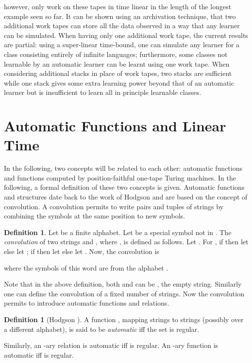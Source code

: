 \documentclass{LMCS}
\theoremstyle{plain}\newtheorem{athm}[thm]{Theorem}
\theoremstyle{plain}\newtheorem{aprop}[thm]{Proposition}
\theoremstyle{plain}\newtheorem{aprob}[thm]{Open Problem}
\theoremstyle{plain}\newtheorem{acor}[thm]{Corollary}
\theoremstyle{plain}\newtheorem{alem}[thm]{Lemma}
\theoremstyle{definition}\newtheorem{adefn}[thm]{Definition}
\theoremstyle{definition}\newtheorem{arem}[thm]{Remark}
\theoremstyle{plain}\newtheorem{aexmp}[thm]{Example}
\theoremstyle{plain}\newtheorem{aclm}[thm]{Claim}
\begin{document}
however, only work on these tapes in time linear in the length of the
longest example seen so far. It can be shown using an archivation
technique, that two additional work tapes can store all the data observed in
a way that any learner can be simulated. When having only one
additional work tape, the current results are partial: using
a super-linear time-bound, one can simulate
any learner for a class consisting entirely of infinite languages;
furthermore, some classes not learnable by an automatic learner
can be learnt using one work tape. When considering additional
stacks in place of work tapes, two stacks are sufficient while one stack
gives some extra learning power beyond that of an automatic learner
but is insufficient to learn all in principle learnable classes.


\section{Automatic Functions and Linear Time} \label{se:autofuncchar}

\noindent
In the following, two concepts will be related to each other:
automatic functions and functions computed by position-faithful
one-tape Turing machines. In the following, a formal definition
of these two concepts is given. Automatic functions and structures
date back to the work of Hodgson \cite{Ho76,Ho83} and are based
on the concept of convolution. A convolution permits to write pairs
and tuples of strings by combining the symbols at the same position
to new symbols.

\begin{adefn}
\rm 
Let  be a finite alphabet.
Let  be a special symbol not in .
The {\em convolution}  
of two strings  and ,
where ,
is defined as follows. Let
.
For ,
if  then let  else let ;
if  then let  else let .
Now, the convolution is

where the symbols of this word are from the alphabet
.
\end{adefn}

\noindent
Note that in the above definition, both  and  can be ,
the empty string.
Similarly one can define the
convolution of a fixed number of strings. Now the convolution permits
to introduce automatic functions and relations.

\begin{adefn}[Hodgson \cite{Ho76,Ho83}]
\rm A function , mapping strings to strings
(possibly over a different alphabet), is said to be 
{\em automatic} iff the set
 is regular.

Similarly, an -ary relation
 is
automatic iff
 is
regular. An -ary function  is automatic iff
 is regular.
\end{adefn}
\end{document}
